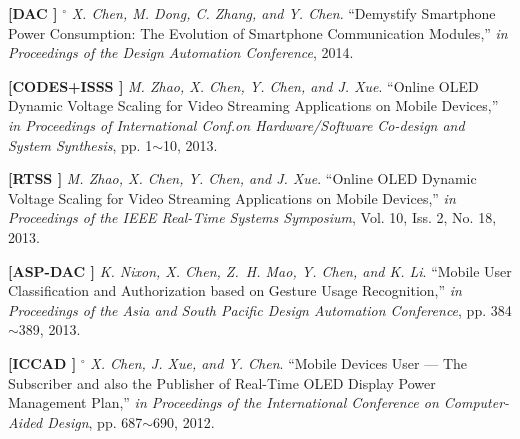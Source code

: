 	\textbf{[DAC ]}
	$^\circ$
	\textsl{X. Chen, M. Dong, C. Zhang, and Y. Chen}.
		``Demystify Smartphone Power Consumption: The Evolution of Smartphone Communication Modules,''
		\textsl{in Proceedings of the Design Automation Conference}, 2014.
			\vspace{-3mm}

	\textbf{[CODES+ISSS ]}\hspace{2mm}
	\textsl{M. Zhao, X. Chen, Y. Chen, and J. Xue}.
		``Online OLED Dynamic Voltage Scaling for Video Streaming Applications on Mobile Devices,''
		\textsl{in Proceedings of International Conf.\@ on Hardware/Software Co-design and System Synthesis}, pp. 1$\sim$10, 2013.
			\vspace{-4mm}
			\vspace{-3mm}

	\textbf{[RTSS ]}\hspace{2mm}
	\textsl{M. Zhao, X. Chen, Y. Chen, and J. Xue}.
		``Online OLED Dynamic Voltage Scaling for Video Streaming Applications on Mobile Devices,''
		\textsl{in Proceedings of the IEEE Real-Time Systems Symposium}, Vol. 10, Iss. 2, No. 18, 2013.
			\vspace{-3mm}

	\textbf{[ASP-DAC ]}\hspace{2mm}
	\textsl{K. Nixon, X. Chen, Z.~H. Mao, Y. Chen, and K. Li}.
		``Mobile User Classification and Authorization based on Gesture Usage Recognition,''
		\textsl{in Proceedings of the Asia and South Pacific Design Automation Conference}, pp. 384$\sim$389, 2013.
			\vspace{-3mm}

	\textbf{[ICCAD ]}
	$^\circ$
	\textsl{X. Chen, J. Xue, and Y. Chen}.
		``Mobile Devices User --- The Subscriber and also the Publisher of Real-Time OLED Display Power Management Plan,''
		\textsl{in Proceedings of the International Conference on Computer-Aided Design}, pp. 687$\sim$690, 2012.
			\vspace{-3mm}

